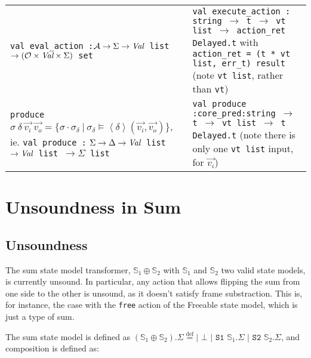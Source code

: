 \documentclass[,a4paper,oneside]{article}
\newcommand{\code}[1]{\texttt{#1}}
\newcommand{\defeq}[0]{\stackrel{\text{def}}=}
\newcommand{\mmdl}[0]{\ensuremath{\mathbb S}}
\newcommand{\rarr}[0]{\ensuremath{\rightarrow}}
\begin{document}
\begin{tabularx}{\textwidth}{X|X}
	\thead{\bfseries Theory} & \thead{\bfseries Gillian} \\ \hline\hline
\code{val eval\_action :\newline ${\cal A}\rarr\Sigma\rarr \textrm{\it Val}$ list $\rarr ({\cal O}\times \textrm{\it Val} \times \Sigma)$ set}
	& \small\code{val execute\_action :\newline
    string $\rarr$ t $\rarr$ vt list $\rarr$ action\_ret Delayed.t}
    with \code{action\_ret = (t * vt list, err\_t) result} (note \code{vt list}, rather than \code{vt})
    \\\hline
    \code{produce }$\sigma ~\delta ~\vec{v_i}~\vec{v_o} = \{ \sigma\cdot\sigma_\delta ~|~\sigma_\delta \vDash \left<\delta\right> (\vec{v_i}, \vec{v_o}) \}$, ie.\newline
    \small\code{val produce :}\newline
    \code{$\Sigma\rarr\Delta \rarr \textrm{\it Val}$ list $\rarr \textrm{\it Val}$ list $\rarr \Sigma$ list}
    & \small\code{val produce :\newline core\_pred:string $\rarr$ t $\rarr$ vt list $\rarr$ t Delayed.t} (note there is only one \code{vt list} input, for $\vec{v_i}$)
    
\end{tabularx}

\clearpage

\section{Unsoundness in Sum}

\subsection{Unsoundness}

\newcommand{\sone}[0]{\code{S1 }}
\newcommand{\stwo}[0]{\code{S2 }}

The sum state model transformer, $\mmdl_1 \oplus \mmdl_2$ with $\mmdl_1$ and $\mmdl_2$ two valid state models, is currently unsound. In particular, any action that allows flipping the sum from one side to the other is unsound, as it doesn't satisfy frame substraction. This is, for instance, the case with the \code{free} action of the Freeable state model, which is just a type of sum.

The sum state model is defined as $(\mmdl_1 \oplus \mmdl_2).\Sigma \defeq \code{| }\bot \code{ | S1 } \mmdl_1.\Sigma \code{ | S2 } \mmdl_2.\Sigma$, and composition is defined as:
\end{document}
